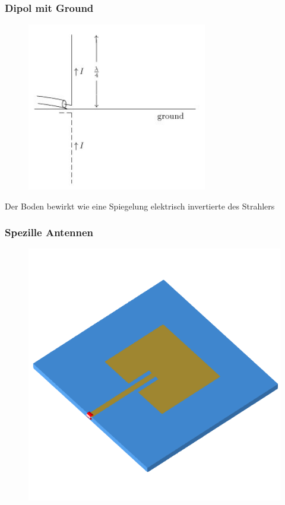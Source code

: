 \begin{frame}
  \frametitle{Dipol mit Ground}
  \begin{center}
    \begin{figure}
      \includegraphics[width=0.7\textwidth,height=.75\textheight,keepaspectratio]{a09/A6-3EN.jpg}
    \end{figure}
    Der Boden bewirkt wie eine Spiegelung elektrisch invertierte des Strahlers
  \end{center}
\end{frame}

\begin{frame}
  \frametitle{Spezille Antennen}
  \begin{center}
    \begin{figure}
      \includegraphics[width=1\textwidth,height=.75\textheight,keepaspectratio]{a09/patch.png}
    \end{figure}
  \end{center}
\end{frame}

